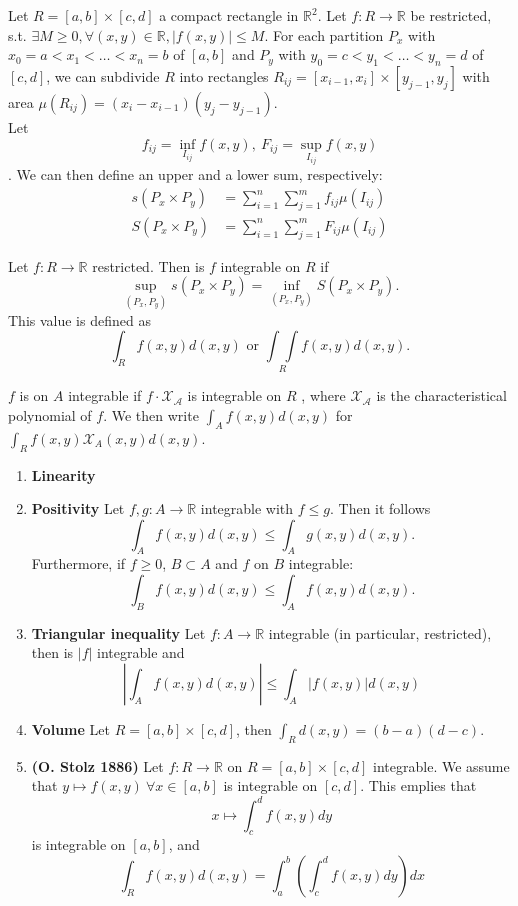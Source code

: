 \documentclass[10pt,landscape, a4paper]{article}
\newcommand{\custombox}[3]{\begin{tcolorbox}[left=0mm,right=0mm,bottom=0mm,top=0mm,title = \textbf{#1}, colback=#2!10!white, colframe = #2!70!white, coltitle=white, breakable]
    #3
    \end{tcolorbox}}
\newcommand{\definition}[2]{\custombox{Definition #1}{red}{#2}}
\newcommand{\other}[2]{\custombox{#1}{green!60!black}{#2}}
\newcommand{\R}{\mathbb{R}}
\begin{document}
\begin{multicols*}{3}
    \definition{Integral on a rectangle}{
    Let $R = [a,b]\times [c,d]$ a compact rectangle in $\R^2$. Let $f:R \to \R$  be restricted, s.t. $\exists M \geqslant 0, \forall (x,y)\in \R, |f(x,y)|\leqslant M$.
    For each partition $P_x$ with $x_0 = a<x_1<\dots <x_n=b$ of $[a,b]$ and $P_y$ with $y_0 = c < y_1 < \dots <y_n = d$ of $[c,d]$, we can subdivide $R$ into rectangles $R_{ij} = [x_{i-1},x_i]\times [y_{j-1},y_j]$ with area $\mu(R_{ij}) = (x_i-x_{i-1})(y_j-y_{j-1})$.\\
    Let $$f_{ij} = \inf_{I_{ij}}f(x,y),\ F_{ij} = \sup_{I_{ij}}f(x,y)$$.
    We can then define an upper and a lower sum, respectively:
    \begin{align*}
        s(P_x\times P_y) & = \sum_{i=1}^n \sum_{j=1}^m f_{ij}\mu(I_{ij}) \\
        S(P_x\times P_y) & = \sum_{i=1}^n \sum_{j=1}^m F_{ij}\mu(I_{ij})
    \end{align*}
    }

    \definition{Riemann integrable in $\R^2$}{
        Let $f: R\to \R$ restricted. Then is $f$ integrable on $R$ if $$\sup_{(P_x,P_y)} s(P_x\times P_y)=\inf_{(P_x,P_y)}  S(P_x\times P_y).$$
        This value is defined as $$
            \int_Rf(x,y)d(x,y) \text{ or } \underset{R}{\int \int} f(x,y)d(x,y).
        $$
    }

    \definition{Riemann integrable and characteristical funciton}{
        $f$ is on $A$ integrable if $f\cdot \mathcal{X_A}$ is integrable on $R$ , where $\mathcal{X_A}$ is the characteristical polynomial of $f$. We then write $\int_A f(x,y)d(x,y)$ for $\int_R f(x,y) \mathcal{X}_A(x,y)d(x,y)$.
    }

    \other{Riemann integral's properties}{
        \begin{enumerate}[label=(\arabic*)]
            \item \textbf{Linearity}
            \item \textbf{Positivity} Let $f,g: A \to \R$ integrable with $f\leqslant g$. Then it follows $$\int_Af(x,y)d(x,y) \leqslant \int_Ag(x,y)d(x,y).$$ Furthermore, if $f\geqslant 0$, $B\subset A$ and $f$ on $B$ integrable:$$\int_Bf(x,y)d(x,y) \leqslant \int_Af(x,y)d(x,y).$$
            \item \textbf{Triangular inequality} Let $f:A\to \R$ integrable (in particular, restricted), then is $|f|$ integrable and $$\left|\int_Af(x,y)d(x,y)\right|\leqslant \int_A\left|f(x,y)\right|d(x,y)$$
            \item \textbf{Volume} Let $R = [a,b]\times [c,d]$, then $\int_Rd(x,y) = (b-a)(d-c)$.
            \item \textbf{(O. Stolz 1886)}  Let $f:R\to \R$ on $R = [a,b]\times [c,d]$ integrable. We assume that $y\mapsto f(x,y)\ \forall x\in[a,b]$ is integrable on $[c,d]$. This emplies that $$ x\mapsto \int_c^df(x,y)dy$$ is integrable on $[a,b]$, and $$\int_R f(x,y)d(x,y) = \int_a^b\left(\int_c^df(x,y)dy\right)dx$$
        \end{enumerate}
    }


\end{multicols*}
\end{document}
